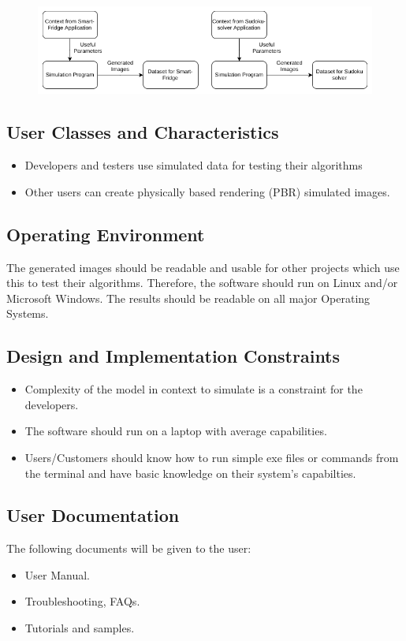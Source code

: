 \documentclass[a4paper,12pt]{article}
\begin{document}
\begin{figure}[H]
\includegraphics[scale=0.6]{sys_sw.png}
\end{figure}
\subsection{User Classes and Characteristics}
\begin{itemize}
\item Developers and testers use simulated data for testing their algorithms
\item Other users can create physically based rendering (PBR) simulated images.
\end{itemize}
\subsection{Operating Environment}
The generated images should be readable and usable for other projects which use this to test their algorithms. Therefore, the software should run on Linux and/or Microsoft Windows. The results should be readable on all major Operating Systems.
\subsection{Design and Implementation Constraints}
\begin{itemize}
\item Complexity of the model in context to simulate is a constraint for the developers.
\item The software should run on a laptop with average capabilities.
\item Users/Customers should know how to run simple exe files or commands from the terminal and have basic knowledge on their system's capabilties.

\end{itemize}
\subsection{User Documentation}
The following documents will be given to the user:
\begin{itemize}
\item User Manual.
\item Troubleshooting, FAQs.
\item Tutorials and samples.
\end{itemize}
\end{document}
